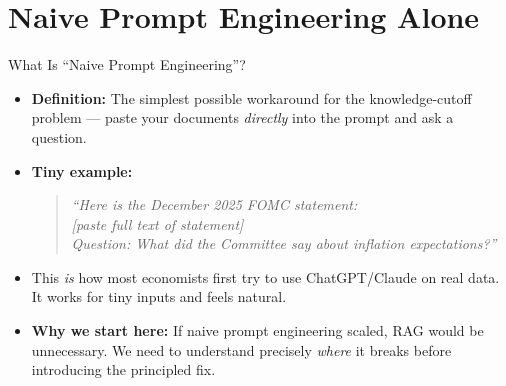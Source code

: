 \documentclass[10pt,english,aspectratio=169]{beamer}
\begin{document}
\section{Naive Prompt Engineering Alone}

\begin{frame}{What Is ``Naive Prompt Engineering''?}
\begin{itemize}
\item \textbf{Definition:} The simplest possible workaround for the knowledge-cutoff problem --- paste your documents \emph{directly} into the prompt and ask a question.

\medskip
\item \textbf{Tiny example:}
\begin{quote}
\small
\textit{``Here is the December 2025 FOMC statement:\\
{[paste full text of statement]}\\
Question: What did the Committee say about inflation expectations?''}
\end{quote}

\medskip
\item This \emph{is} how most economists first try to use ChatGPT/Claude on real data. It works for tiny inputs and feels natural.

\medskip
\item \textbf{Why we start here:} If naive prompt engineering scaled, RAG would be unnecessary. We need to understand precisely \emph{where} it breaks before introducing the principled fix.
\end{itemize}
\end{frame}
\end{document}
